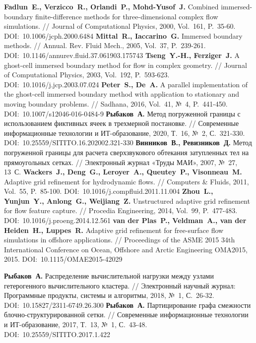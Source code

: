 \begin{thebibliography}{99}
\textbf{Fadlun~E., Verzicco~R., Orlandi~P., Mohd-Yusof~J.} Combined immersed-boundary finite-difference methods for three-dimensional complex flow simulations. // Journal of Computational Physics, 2000, Vol.~161, P.~35-60. DOI:~10.1006/jcph.2000.6484
\textbf{Mittal~R., Iaccarino~G.} Immersed boundary methods. // Annual. Rev. Fluid Mech., 2005, Vol.~37, P.~239-261. DOI:~10.1146/annurev.fluid.37.061903.175743
\textbf{Tseng~Y.-H., Ferziger~J.} A ghost-cell immersed boundary method for flow in complex geometry. // Journal of Computational Physics, 2003, Vol.~192, P.~593-623. DOI:~10.1016/j.jcp.2003.07.024
\textbf{Peter~S., De~A.} A parallel implementation of the ghost-cell immersed boundary method with application to stationary and moving boundary problems. // Sadhana, 2016, Vol.~41, №~4, P.~441-450. DOI:~10.1007/s12046-016-0484-9
\textbf{Рыбаков~А.} Метод погруженной границы с использованием фиктивных ячеек в трехмерной постановке. // Современные информационные технологии и ИТ-образование, 2020, Т.~16, №~2, С.~321-330. DOI:~10.25559/SITITO.16.202002.321-330
\textbf{Винников~В., Ревизников~Д.} Метод погруженной границы для расчета сверхзвукового обтекания затупленных тел на прямоугольных сетках. // Электронный журнал «Труды МАИ», 2007, №~27, 13~С.
\textbf{Wackers~J., Deng~G., Leroyer~A., Queutey~P., Visonneau~M.} Adaptive grid refinement for hydrodynamic flows. // Computers \& Fluids, 2011, Vol.~55, P.~85-100. DOI:~10.1016/j.compfluid.2011.11.004
\textbf{Zhou~L., Yunjun~Y., Anlong~G., Weijiang~Z.} Unstructured adaptive grid refinement for flow feature capture. // Procedia Engineering, 2014, Vol.~99, P.~477-483. DOI:~10.1016/j.proeng.2014.12.561
\textbf{van der Plas~P., Veldman~A., van der Heiden~H., Luppes~R.} Adaptive grid refinement for free-surface flow simulations in offshore applications. // Proceedings of the ASME 2015 34th International Conference on Ocean, Offshore and Arctic Engineering OMA2015, 2015. DOI:~10.1115/OMAE2015-42029



\textbf{Рыбаков~А.} Распределение вычислительной нагрузки между узлами гетерогенного вычислительного кластера. // Электронный научный журнал: Программные продукты, системы и алгоритмы, 2018, №~1, С.~26-32. DOI:~10.15827/2311-6749.26.300
\textbf{Рыбаков~А.} Партицирование графа смежности блочно-структурированной сетки. // Современные информационные технологии и ИТ-образование, 2017, Т.~13, №~1, С.~43-48. DOI:~10.25559/SITITO.2017.1.422


\end{thebibliography}
